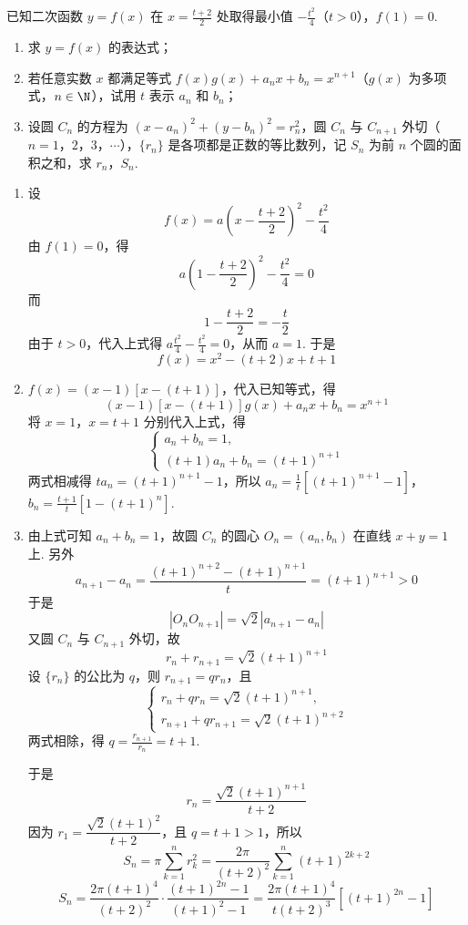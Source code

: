 \begin{problem}
已知二次函数 \(y=f(x)\) 在 \(x=\frac{t+2}{2}\) 处取得最小值 \(-\frac{t^2}{4}\)（\(t>0\)），\(f(1)=0\).

\begin{enumerate}
\item 求 \(y=f(x)\) 的表达式；
\item 若任意实数 \(x\) 都满足等式 \(f(x)g(x)+a_nx+b_n=x^{n+1}\)（\(g(x)\) 为多项式，\(n\in\N\)），试用 \(t\) 表示 \(a_n\) 和 \(b_n\)；
\item 设圆 \(C_n\) 的方程为 \((x-a_n)^2+(y-b_n)^2=r_n^2\)，圆 \(C_n\) 与 \(C_{n+1}\) 外切（\(n=1\)，\(2\)，\(3\)，\(\cdots\)），\(\{r_n\}\) 是各项都是正数的等比数列，记 \(S_n\) 为前 \(n\) 个圆的面积之和，求 \(r_n\)，\(S_n\).
\end{enumerate}
\end{problem}

\begin{solution}
\begin{enumerate}
\item 设
\[
f(x)=a\left(x-\frac{t+2}{2}\right)^2-\frac{t^2}{4}
\]
由 \(f(1)=0\)，得
\[
a\left(1-\frac{t+2}{2}\right)^2-\frac{t^2}{4}=0
\]
而
\[
1-\frac{t+2}{2}=-\frac t2
\]
由于 \(t>0\)，代入上式得 \(a\frac{t^2}{4}-\frac{t^2}{4}=0\)，从而 \(a=1\). 于是
\[
f(x)=x^2-(t+2)x+t+1
\]

\item \(f(x)=(x-1)[x-(t+1)]\)，代入已知等式，得
\[
(x-1)[x-(t+1)]g(x)+a_nx+b_n=x^{n+1}
\]
将 \(x=1\)，\(x=t+1\) 分别代入上式，得
\[
\begin{cases}
a_n+b_n=1,\\
(t+1)a_n+b_n=(t+1)^{n+1}
\end{cases}
\]
两式相减得 \(ta_n=(t+1)^{n+1}-1\)，所以
\(a_n=\frac{1}{t}\left[(t+1)^{n+1}-1\right]\)，\(b_n=\frac{t+1}{t}\left[1-(t+1)^n\right]\).

\item 由上式可知 \(a_n+b_n=1\)，故圆 \(C_n\) 的圆心 \(O_n=(a_n,b_n)\) 在直线 \(x+y=1\) 上. 另外
\[
a_{n+1}-a_n=\frac{(t+1)^{n+2}-(t+1)^{n+1}}{t}=(t+1)^{n+1}>0
\]
于是
\[
|O_nO_{n+1}|=\sqrt{2}|a_{n+1}-a_n|
\]
又圆 \(C_n\) 与 \(C_{n+1}\) 外切，故
\[
r_n+r_{n+1}=\sqrt{2}(t+1)^{n+1}
\]
设 \(\{r_n\}\) 的公比为 \(q\)，则 \(r_{n+1}=qr_n\)，且
\[
\begin{cases}
r_n+qr_n=\sqrt{2}(t+1)^{n+1},\\
r_{n+1}+qr_{n+1}=\sqrt{2}(t+1)^{n+2}
\end{cases}
\]
两式相除，得 \(q=\frac{r_{n+1}}{r_n}=t+1\).

于是
\[
r_n=\frac{\sqrt{2}(t+1)^{n+1}}{t+2}
\]
因为 \(r_1=\dfrac{\sqrt{2}(t+1)^2}{t+2}\)，且 \(q=t+1>1\)，所以
\[
S_n=\pi\sum_{k=1}^n r_k^2
=\frac{2\pi}{(t+2)^2}\sum_{k=1}^n(t+1)^{2k+2}
\]
\[
S_n=\frac{2\pi(t+1)^4}{(t+2)^2}\cdot\frac{(t+1)^{2n}-1}{(t+1)^2-1}
=\frac{2\pi(t+1)^4}{t(t+2)^3}\left[(t+1)^{2n}-1\right]
\]
\end{enumerate}
\end{solution}
